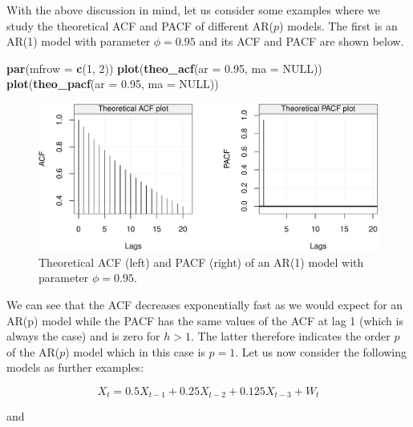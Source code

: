\documentclass[]{book}
\newenvironment{Shaded}{\begin{snugshade}}{\end{snugshade}}
\newcommand{\KeywordTok}[1]{\textcolor[rgb]{0.13,0.29,0.53}{\textbf{#1}}}
\newcommand{\DataTypeTok}[1]{\textcolor[rgb]{0.13,0.29,0.53}{#1}}
\newcommand{\DecValTok}[1]{\textcolor[rgb]{0.00,0.00,0.81}{#1}}
\newcommand{\FloatTok}[1]{\textcolor[rgb]{0.00,0.00,0.81}{#1}}
\newcommand{\OtherTok}[1]{\textcolor[rgb]{0.56,0.35,0.01}{#1}}
\newcommand{\NormalTok}[1]{#1}
\theoremstyle{definition}
\theoremstyle{definition}
\theoremstyle{definition}
\theoremstyle{remark}
\begin{document}
With the above discussion in mind, let us consider some examples where
we study the theoretical ACF and PACF of different AR(\(p\)) models. The
first is an AR(1) model with parameter \(\phi = 0.95\) and its ACF and
PACF are shown below.

\begin{Shaded}
\begin{Highlighting}[]
\KeywordTok{par}\NormalTok{(}\DataTypeTok{mfrow =} \KeywordTok{c}\NormalTok{(}\DecValTok{1}\NormalTok{, }\DecValTok{2}\NormalTok{))}
\KeywordTok{plot}\NormalTok{(}\KeywordTok{theo_acf}\NormalTok{(}\DataTypeTok{ar =} \FloatTok{0.95}\NormalTok{, }\DataTypeTok{ma =} \OtherTok{NULL}\NormalTok{))}
\KeywordTok{plot}\NormalTok{(}\KeywordTok{theo_pacf}\NormalTok{(}\DataTypeTok{ar =} \FloatTok{0.95}\NormalTok{, }\DataTypeTok{ma =} \OtherTok{NULL}\NormalTok{))}
\end{Highlighting}
\end{Shaded}

\begin{figure}

{\centering \includegraphics{ts_files/figure-latex/unnamed-chunk-42-1} 

}

\caption{Theoretical ACF (left) and PACF (right) of an AR(1) model with parameter $\phi = 0.95$.}\label{fig:unnamed-chunk-42}
\end{figure}

We can see that the ACF decreases exponentially fast as we would expect
for an AR(p) model while the PACF has the same values of the ACF at lag
1 (which is always the case) and is zero for \(h > 1\). The latter
therefore indicates the order \(p\) of the AR(\(p\)) model which in this
case is \(p=1\). Let us now consider the following models as further
examples:

\[X_t = 0.5 X_{t-1} + 0.25 X_{t-2} + 0.125 X_{t-3} + W_t\]

and
\end{document}

